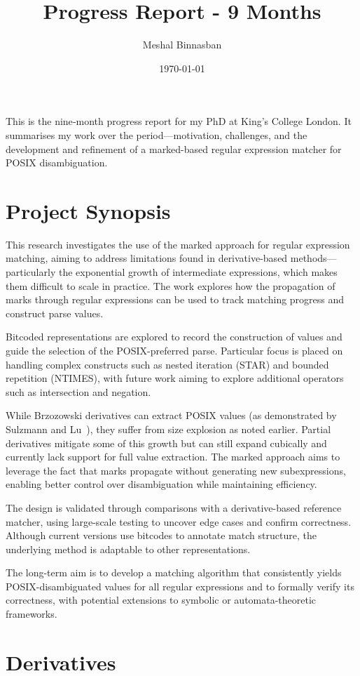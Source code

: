 \documentclass[12pt]{article}
\title{Progress Report - 9 Months}
\author{Meshal Binnasban}
\date{\today}
\begin{document}
\maketitle
This is the nine‑month progress report for my PhD at King's College London. It summarises my work over
the period—motivation, challenges, and the development and refinement of a marked-based regular expression
matcher for POSIX disambiguation.
\section*{Project Synopsis}
This research investigates the use of the marked approach for regular expression matching, aiming to address 
limitations found in derivative-based methods—particularly the exponential growth of intermediate expressions,
which makes them difficult to scale in practice. The work explores how the propagation of marks through regular
expressions can be used to track matching progress and construct parse values.

Bitcoded representations are explored to record the construction of values and guide the selection of the 
POSIX-preferred parse. Particular focus is placed on handling complex constructs such as nested iteration (STAR) 
and bounded repetition (NTIMES), with future work aiming to explore additional operators such as intersection and
negation.

While Brzozowski derivatives can extract POSIX values (as demonstrated by Sulzmann and Lu~\cite{Sulzmann2014}), 
they suffer from size explosion as noted earlier. Partial derivatives mitigate some of this growth but can still 
expand cubically and currently lack support for full value extraction. The marked approach aims to leverage the 
fact that marks propagate without generating new subexpressions, enabling better control over disambiguation while
maintaining efficiency.

The design is validated through comparisons with a derivative-based reference matcher, using large-scale testing 
to uncover edge cases and confirm correctness. Although current versions use bitcodes to annotate match structure,
the underlying method is adaptable to other representations.

The long-term aim is to develop a matching algorithm that consistently yields POSIX-disambiguated values for all 
regular expressions and to formally verify its correctness, with potential extensions to symbolic or automata-theoretic 
frameworks.
\newpage
\section{Derivatives}
\end{document}
